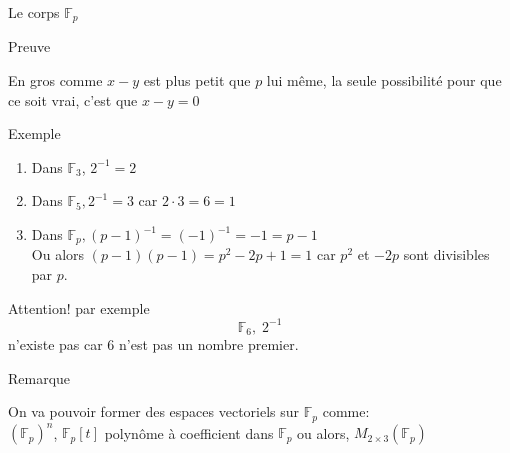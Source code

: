 \begin{parag}{Le corps $\mathbb{F}_p$}
\begin{subparag}{Preuve}
\begin{itemize}
    \end{itemize}
    \begin{framedremark}
        En gros comme $x - y$ est plus petit que $p$ lui même, la seule possibilité pour que ce soit vrai, c'est que $x - y = 0$
    \end{framedremark}
\end{subparag}
\begin{subparag}{Exemple}
\begin{enumerate}
    \item Dans $\mathbb{F}_3$, $2^{-1} = 2$
    \item Dans $\mathbb{F}_5, 2^{-1} = 3$ car $2\cdot 3 = 6 = 1$
    \item Dans $\mathbb{F}_p, (p-1)^{-1}  = (-1)^{-1} = -1 = p-1 $
    \\
    Ou alors $(p-1)(p-1) = p^2-2p + 1 = 1$ car $p^2$ et $-2p$ sont divisibles par $p$.
\end{enumerate}
\begin{framedremark}
    Attention! par exemple
    \[\mathbb{F}_6, \; 2^{-1} \]
    n'existe pas car $6$ n'est pas un nombre premier.
\end{framedremark}
\end{subparag}
\begin{subparag}{Remarque}
\begin{framedremark}
    On va pouvoir former des espaces vectoriels sur $\mathbb{F}_p$ comme:
    \\
    $(\mathbb{F}_p)^n$, $\mathbb{F}_p[t]$ polynôme à coefficient dans $\mathbb{F}_p$ ou alors, $M_{2\times 3}(\mathbb{F}_p)$
\end{framedremark}
\end{subparag}
\end{parag}


